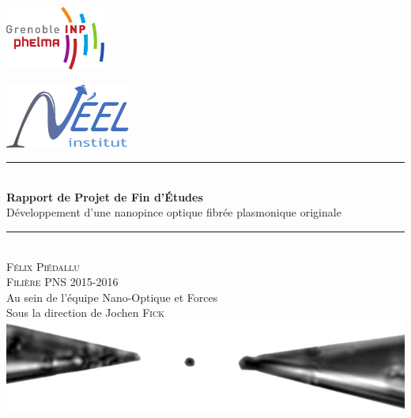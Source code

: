 \begin{titlepage}
    \vspace*{-10px}
    \includegraphics[height=80px]{Images/logo_phelma.pdf}
    \vspace*{-80px}
\begin{flushright}
    \vspace*{-10px}
    \includegraphics[height=80px]{Images/Logo_Neel.pdf}
\end{flushright}

\vspace*{1.5cm}
\begin{center}
\rule{\linewidth}{0.5mm}\\[0.4cm]
{\huge{\bfseries Rapport de Projet de Fin d'Études}\\[0.4cm]
Développement d'une nanopince optique fibrée plasmonique originale\\[0.4cm]}
\rule{\linewidth}{0.5mm}\\[0.5cm]

\LARGE{\textsc{Félix Piédallu}}\\[0.7cm]
\large{\textsc{Filière PNS 2015-2016}}\\[2cm]

\Large{Au sein de l'équipe Nano-Optique et Forces}\\[1cm]

\Large{Sous la direction de Jochen \textsc{Fick}}\\[2cm]

\includegraphics[width=\textwidth]{Images/Illustration.png}\\[1cm]


\end{center}
\end{titlepage}

\tableofcontents        %
\newpage
{}  %
